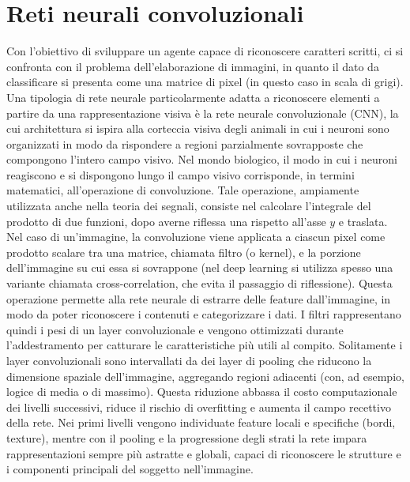 \documentclass[a4paper,12pt]{article}
\begin{document}
\section{Reti neurali convoluzionali}\label{cnn}
Con l'obiettivo di sviluppare un agente capace di riconoscere caratteri scritti, ci si confronta con il problema dell'elaborazione di immagini, in quanto il dato da classificare si presenta come una matrice di pixel (in questo caso in scala di grigi).
Una tipologia di rete neurale particolarmente adatta a riconoscere elementi a partire da una rappresentazione visiva è la rete neurale convoluzionale (CNN), la cui architettura si ispira alla corteccia visiva degli animali in cui i neuroni sono organizzati in modo da rispondere a regioni parzialmente sovrapposte che compongono l'intero campo visivo.
Nel mondo biologico, il modo in cui i neuroni reagiscono e si dispongono lungo il campo visivo corrisponde, in termini matematici, all'operazione di convoluzione.
Tale operazione, ampiamente utilizzata anche nella teoria dei segnali, consiste nel calcolare l'integrale del prodotto di due funzioni, dopo averne riflessa una rispetto all'asse $y$ e traslata.
Nel caso di un'immagine, la convoluzione viene applicata a ciascun pixel come prodotto scalare tra una matrice, chiamata filtro (o kernel), e la porzione dell'immagine su cui essa si sovrappone (nel deep learning si utilizza spesso una variante chiamata cross-correlation, che evita il passaggio di riflessione).
Questa operazione permette alla rete neurale di estrarre delle feature dall'immagine, in modo da poter riconoscere i contenuti e categorizzare i dati.
I filtri rappresentano quindi i pesi di un layer convoluzionale e vengono ottimizzati durante l'addestramento per catturare le caratteristiche più utili al compito.
Solitamente i layer convoluzionali sono intervallati da dei layer di pooling che riducono la dimensione spaziale dell'immagine, aggregando regioni adiacenti (con, ad esempio, logice di media o di massimo). Questa riduzione abbassa il costo computazionale dei livelli successivi, riduce il rischio di overfitting e aumenta il campo recettivo della rete.
Nei primi livelli vengono individuate feature locali e specifiche (bordi, texture), mentre con il pooling e la progressione degli strati la rete impara rappresentazioni sempre più astratte e globali, capaci di riconoscere le strutture e i componenti principali del soggetto nell'immagine.
\end{document}

